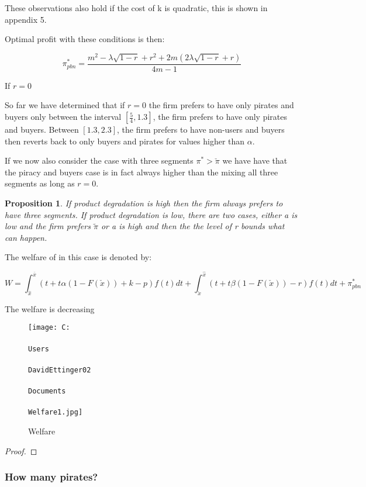 \documentclass{article}
\newtheorem{proposition}{Proposition}
\begin{document}
These observations also hold if the cost of k is quadratic, this is shown in appendix 5. 

Optimal profit with these conditions is then: 

\begin{equation*}
\pi^*_{pbn} = \frac{m^2-\lambda \sqrt{1-r} +r^2 +2m(2 \lambda \sqrt{1-r} +r) }{4m-1}
\end{equation*}

If $r=0$

So far we have determined that if $r=0$ the firm prefers to have only pirates and buyers only between the interval $[\frac{5}{4},1.3]$, the firm prefers to have only pirates and buyers. Between $[1.3,2.3]$, the firm prefers to have non-users and buyers then reverts back to only buyers and pirates for values higher than $\alpha$. 

If we now also consider the case with three segments $\pi^*>\check{\pi}$ we have have that the piracy and buyers case is in fact always higher than the mixing all three segments as long as $r=0$.  

\begin{proposition}
If product degradation is high then the firm always prefers to have three segments. If product degradation is low, there are two cases, either a is low and the firm prefers $\tilde{\pi}$ or a is high and then the the level of r bounds what can happen. 
\end{proposition}


The welfare of in this case is denoted by: 

\[
W = \int_{\hat{x}}^{\overline{x}}(t + t\alpha(1-F(\check{x})) +k -p)f(t)dt 
+ \int_{\check{x}}^{\hat{x}}(t+t\beta(1-F( \check{x} )) -r)f(t) dt +\pi^*_{pbn} 
\] 

The welfare is decreasing 
\begin{figure}[h!]
  \caption{Welfare}
  \centering
  \texttt{[image: C:\\\\Users\\\\DavidEttinger02\\\\Documents\\\\Welfare1.jpg]}
\end{figure}

\begin{proof}

\end{proof}



\subsubsection{How many pirates?}
\end{document}
